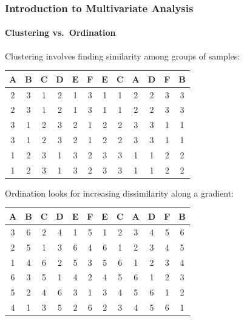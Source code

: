 \documentclass[10pt]{beamer}
\begin{document}
\begin{frame}
\frametitle{Introduction to Multivariate Analysis}
\framesubtitle{Clustering vs.~Ordination}

{\footnotesize
{\color{blue}Clustering} involves finding similarity among groups of samples:

\begin{center}
\begin{tabular}{|cccccc||cccccc|} \hline
A & B & C & D & E & F	& E & C & A & D & F & B\\ \hline
2 & 3 & 1 & 2 & 1 & 3	& {\color{red}1} & {\color{red}1} & {\color{blue}2} & {\color{blue}2} & {\color{green}3} & {\color{green}3}\\
2 & 3 & 1 & 2 & 1 & 3	& {\color{red}1} & {\color{red}1} & {\color{blue}2} & {\color{blue}2} & {\color{green}3} & {\color{green}3}\\
3 & 1 & 2 & 3 & 2 & 1	& {\color{red}2} & {\color{red}2} & {\color{blue}3} & {\color{blue}3} & {\color{green}1} & {\color{green}1}\\
3 & 1 & 2 & 3 & 2 & 1	& {\color{red}2} & {\color{red}2} & {\color{blue}3} & {\color{blue}3} & {\color{green}1} & {\color{green}1}\\
1 & 2 & 3 & 1 & 3 & 2	& {\color{red}3} & {\color{red}3} & {\color{blue}1} & {\color{blue}1} & {\color{green}2} & {\color{green}2}\\
1 & 2 & 3 & 1 & 3 & 2	& {\color{red}3} & {\color{red}3} & {\color{blue}1} & {\color{blue}1} & {\color{green}2} & {\color{green}2}\\ \hline
\end{tabular}
\end{center}


{\color{blue}Ordination} looks for increasing dissimilarity along a gradient:

\begin{center}
\begin{tabular}{|cccccc||cccccc|} \hline
A & B & C & D & E & F	& E & C & A & D & F & B\\ \hline
3 & 6 & 2 & 4 & 1 & 5	& {\color{red}1} & {\color{blue}2} & {\color{green}3} & 4 & {\color{green}5} & {\color{blue}6}\\
2 & 5 & 1 & 3 & 6 & 4	& {\color{blue}6} & {\color{red}1} & {\color{blue}2} & {\color{green}3} & 4 & {\color{green}5}\\
1 & 4 & 6 & 2 & 5 & 3	& {\color{green}5} & {\color{blue}6} & {\color{red}1} & {\color{blue}2} & {\color{green}3} & 4\\
6 & 3 & 5 & 1 & 4 & 2	& 4 & {\color{green}5} & {\color{blue}6} & {\color{red}1} & {\color{blue}2} & {\color{green}3}\\
5 & 2 & 4 & 6 & 3 & 1	& {\color{green}3} & 4 & {\color{green}5} & {\color{blue}6} & {\color{red}1} & {\color{blue}2}\\
4 & 1 & 3 & 5 & 2 & 6	& {\color{blue}2} & {\color{green}3} & 4 & {\color{green}5} & {\color{blue}6} & {\color{red}1}\\ \hline
\end{tabular}
\end{center}
}

\end{frame}
\end{document}

